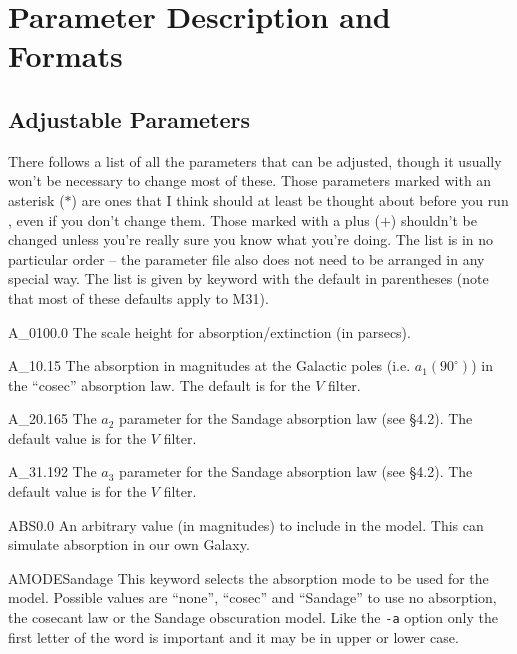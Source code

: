 \section{Parameter Description and Formats}
 
\subsection{Adjustable Parameters}

There follows a list of all the parameters that can be adjusted, though 
it usually won't be necessary to change most of these.
Those parameters marked with an asterisk ($*$)  are
ones that  I think should  at least be thought about before you run \egm,
even if you don't change them. Those marked with a plus ($+$) shouldn't be
changed unless you're really sure you  know what you're doing. The  list
is in no particular order -- the parameter file also does not need to be
arranged  in any  special way.  The list is  given  by  keyword with the
default in parentheses (note that most of these defaults apply to M31).
\medskip

\begin{key}{A\_0}{100.0}{}
The scale height for absorption/extinction (in parsecs).
\end{key}

\begin{key}{A\_1}{0.15}{}
The absorption in magnitudes at the Galactic poles (i.e. $a_1(90^\circ)$) in 
the ``cosec'' absorption law. The default is for the $V$ filter.
\end{key}

\begin{key}{A\_2}{0.165}{}
The $a_2$ parameter for the Sandage absorption law (see \S 4.2). The default 
value is for the $V$ filter.
\end{key}

\begin{key}{A\_3}{1.192}{}
The $a_3$ parameter for the Sandage absorption law (see \S 4.2). The default 
value is for the $V$ filter.
\end{key}

\begin{key}{ABS}{0.0}{}
An arbitrary value (in magnitudes) to include in the model. This can simulate
absorption in our own Galaxy.
\end{key}

\begin{key}{AMODE}{Sandage}{}
This keyword selects the absorption mode to be used for the model. Possible 
values are ``none'', ``cosec'' and ``Sandage'' to use no absorption,
the cosecant law or the Sandage obscuration model. Like the {\tt -a} option
only the first letter of the word is important and it may be in upper or
lower case.
\end{key}

